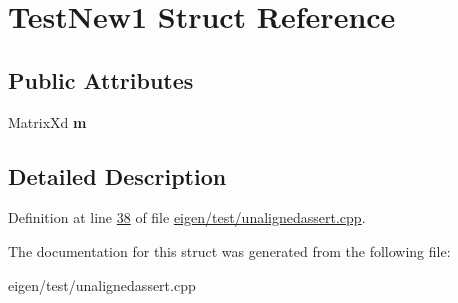 \hypertarget{struct_test_new1}{}\section{Test\+New1 Struct Reference}
\label{struct_test_new1}
\subsection*{Public Attributes}
\begin{DoxyCompactItemize}
\item 
\mbox{\label{struct_test_new1_a556c2b457601f3fac7ea64e56736ecfe}} 
Matrix\+Xd {\bfseries m}
\end{DoxyCompactItemize}


\subsection{Detailed Description}


Definition at line \hyperlink{eigen_2test_2unalignedassert_8cpp_source_l00038}{38} of file \hyperlink{eigen_2test_2unalignedassert_8cpp_source}{eigen/test/unalignedassert.\+cpp}.



The documentation for this struct was generated from the following file\+:\begin{DoxyCompactItemize}
\item 
eigen/test/unalignedassert.\+cpp\end{DoxyCompactItemize}
